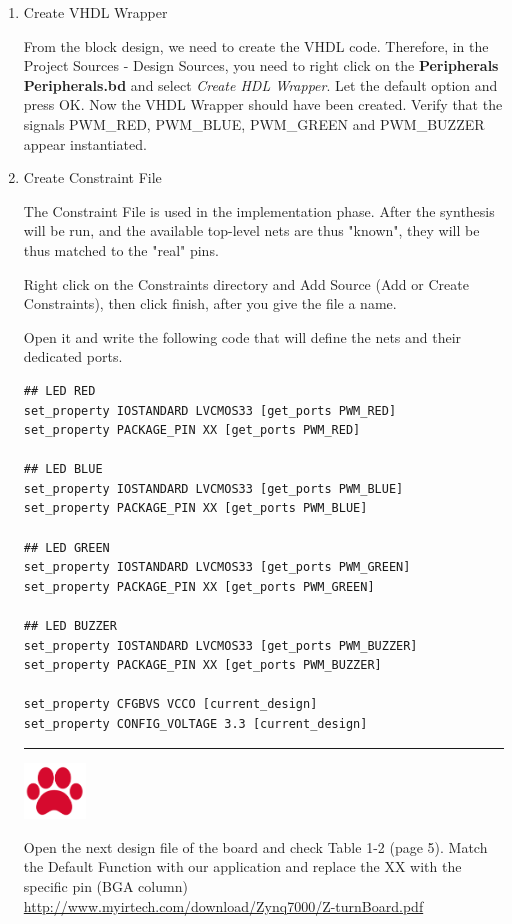 \documentclass{article}
\begin{document}
\begin{itemize}
\begin{enumerate}
\item Create VHDL Wrapper

From the block design, we need to create the VHDL code. Therefore, in the Project Sources - Design Sources, you need to right click on the \textbf{Peripherals Peripherals.bd} and select \textit {Create HDL Wrapper}. Let the default option and press OK. Now the VHDL Wrapper should have been created. Verify that the signals PWM\_RED, PWM\_BLUE, PWM\_GREEN and PWM\_BUZZER appear instantiated. 

 \item Create Constraint File
 
The Constraint File is used in the implementation phase. After the synthesis will be run, and the available top-level nets are thus "known", they will be thus matched to the "real" pins.
  
Right click on the Constraints directory and Add Source (Add or Create Constraints), then click finish, after you give the file a name.

Open it and write the following code that will define the nets and their dedicated ports.

\begin{verbatim}
## LED RED
set_property IOSTANDARD LVCMOS33 [get_ports PWM_RED]
set_property PACKAGE_PIN XX [get_ports PWM_RED]

## LED BLUE
set_property IOSTANDARD LVCMOS33 [get_ports PWM_BLUE]
set_property PACKAGE_PIN XX [get_ports PWM_BLUE]

## LED GREEN
set_property IOSTANDARD LVCMOS33 [get_ports PWM_GREEN]
set_property PACKAGE_PIN XX [get_ports PWM_GREEN]

## LED BUZZER
set_property IOSTANDARD LVCMOS33 [get_ports PWM_BUZZER]
set_property PACKAGE_PIN XX [get_ports PWM_BUZZER]

set_property CFGBVS VCCO [current_design]
set_property CONFIG_VOLTAGE 3.3 [current_design]

\end{verbatim}

\noindent\rule{16.5cm}{1pt}

\noindent\begin{minipage}{.1\textwidth}
  \centering
  \includegraphics[height=1.5cm]{img/icon.png}
\end{minipage}
\begin{minipage}{.8\textwidth}
Open the next design file of the board and check Table 1-2 (page 5). Match the Default Function with our application and replace the XX with the specific pin (BGA column)
\url{http://www.myirtech.com/download/Zynq7000/Z-turnBoard.pdf}
\end{minipage}%


\end{enumerate}
\end{itemize}
\end{document}

